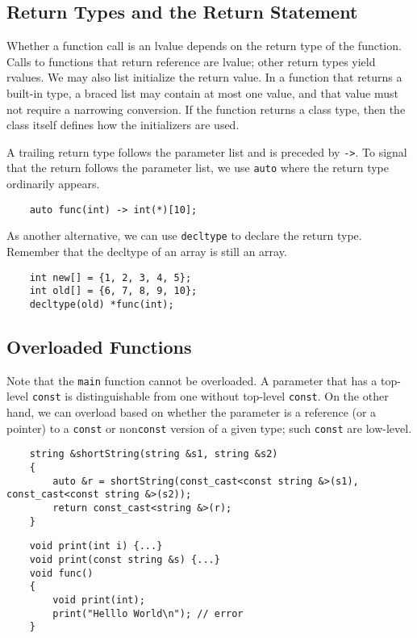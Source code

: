 \documentclass[11pt]{ctexart}
\begin{document}
\subsection{Return Types and the Return Statement}
\par Whether a function call is an lvalue depends on the return type of the function. Calls to functions that return reference are lvalue; other return types yield rvalues. We may also list initialize the return value. In a function that returns a built-in type, a braced list may contain at most one value, and that value must not require a narrowing conversion. If the function returns a class type, then the class itself defines how the initializers are used.
\par A trailing return type follows the parameter list and is preceded by \verb|->|. To signal that the return follows the parameter list, we use \verb|auto| where the return type ordinarily appears.
\begin{lstlisting}
    auto func(int) -> int(*)[10];
\end{lstlisting}
As another alternative, we can use \verb|decltype| to declare the return type. Remember that the decltype of an array is still an array.
\begin{lstlisting}
    int new[] = {1, 2, 3, 4, 5};
    int old[] = {6, 7, 8, 9, 10};
    decltype(old) *func(int);
\end{lstlisting}
\subsection{Overloaded Functions}
\par Note that the \verb|main| function cannot be overloaded. A parameter that has a top-level \verb|const| is distinguishable from one without top-level \verb|const|. On the other hand, we can overload based on whether the parameter is a reference (or a pointer) to a \verb|const| or non\verb|const| version of a given type; such \verb|const| are low-level.
\begin{lstlisting}
    string &shortString(string &s1, string &s2)
    {
        auto &r = shortString(const_cast<const string &>(s1), const_cast<const string &>(s2));
        return const_cast<string &>(r);
    }
\end{lstlisting}
\begin{lstlisting}
    void print(int i) {...}
    void print(const string &s) {...}
    void func()
    {
        void print(int);
        print("Helllo World\n"); // error
    }
\end{lstlisting}
\end{document}

